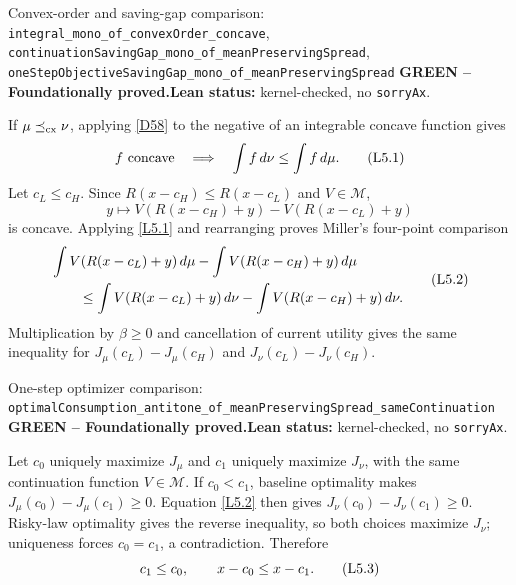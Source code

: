\documentclass[11pt]{article}
\newcommand{\leanname}[1]{\nolinkurl{#1}}
\newcommand{\eqL}[1]{\refstepcounter{equation}\tag{L#1}}
\newcommand{\formalcheck}{\textbf{Lean status:} kernel-checked, no \texttt{sorryAx}.}
\newcommand{\greenstatus}{\textcolor{proved}{\textbf{GREEN -- Foundationally proved.}}}
\begin{document}
\begin{greenbox}{Convex-order and saving-gap comparison:
\leanname{integral_mono_of_convexOrder_concave},
\leanname{continuationSavingGap_mono_of_meanPreservingSpread},
\leanname{oneStepObjectiveSavingGap_mono_of_meanPreservingSpread}}
\greenstatus\quad\formalcheck

If $\mu\preceq_{\rm cx}\nu$, applying \eqref{D58} to the negative of an
integrable concave function gives
\begin{equation}
 f\text{ concave}\quad\Longrightarrow\quad
 \int f\,d\nu\le\int f\,d\mu.
 \eqL{5.1}\label{L5.1}
\end{equation}
Let $c_L\le c_H$.  Since $R(x-c_H)\le R(x-c_L)$ and $V\in\mathcal M$,
\[
 y\longmapsto
 V(R(x-c_H)+y)-V(R(x-c_L)+y)
\]
is concave.  Applying \eqref{L5.1} and rearranging proves Miller's
four-point comparison
\begin{equation}
 \begin{split}
 &\int V(R(x-c_L)+y)\,d\mu-\int V(R(x-c_H)+y)\,d\mu\\
 &\qquad\le
 \int V(R(x-c_L)+y)\,d\nu-\int V(R(x-c_H)+y)\,d\nu.
 \end{split}
 \eqL{5.2}\label{L5.2}
\end{equation}
Multiplication by $\beta\ge0$ and cancellation of current utility gives the
same inequality for $J_\mu(c_L)-J_\mu(c_H)$ and
$J_\nu(c_L)-J_\nu(c_H)$.
\end{greenbox}

\begin{greenbox}{One-step optimizer comparison:
\leanname{optimalConsumption_antitone_of_meanPreservingSpread_sameContinuation}}
\greenstatus\quad\formalcheck

Let $c_0$ uniquely maximize $J_\mu$ and $c_1$ uniquely maximize $J_\nu$,
with the same continuation function $V\in\mathcal M$.  If $c_0<c_1$,
baseline optimality makes $J_\mu(c_0)-J_\mu(c_1)\ge0$.  Equation
\eqref{L5.2} then gives $J_\nu(c_0)-J_\nu(c_1)\ge0$.  Risky-law optimality
gives the reverse inequality, so both choices maximize $J_\nu$; uniqueness
forces $c_0=c_1$, a contradiction.  Therefore
\begin{equation}
 c_1\le c_0,\qquad x-c_0\le x-c_1.
 \eqL{5.3}\label{L5.3}
\end{equation}
\end{greenbox}
\end{document}
